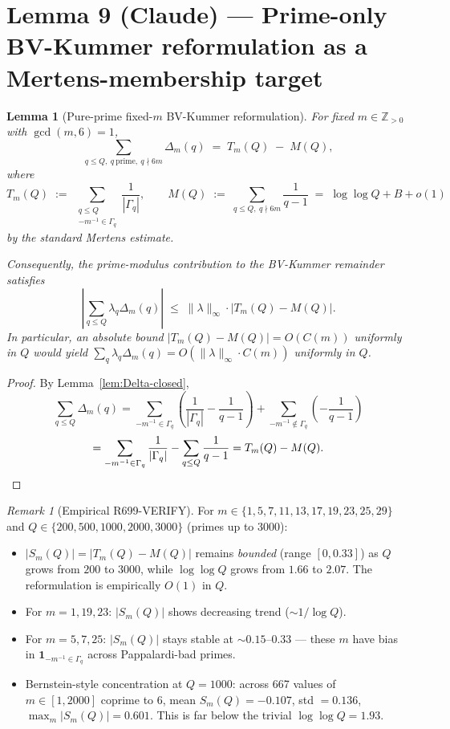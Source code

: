 \documentclass[12pt]{amsart}
\newtheorem{lemma}{Lemma}
\theoremstyle{definition}
\theoremstyle{remark}
\newtheorem{remark}{Remark}
\begin{document}
\section{Lemma 9 (\textbf{Claude}) --- Prime-only BV-Kummer reformulation as a Mertens-membership target}

\begin{lemma}[Pure-prime fixed-$m$ BV-Kummer reformulation]\label{lem:Claude-Mertens}
For fixed $m \in \mathbb{Z}_{> 0}$ with $\gcd(m, 6) = 1$,
$$
\sum_{q \le Q,\ q\ \text{prime},\ q \nmid 6m} \Delta_m(q)
\;=\;
T_m(Q) \;-\; M(Q),
$$
where
$$
T_m(Q)
\;:=\;
\sum_{\substack{q \le Q \\ -m^{-1} \in \Gamma_q}}
\frac{1}{|\Gamma_q|},
\qquad
M(Q)
\;:=\;
\sum_{q \le Q,\ q \nmid 6m}
\frac{1}{q - 1}
\;=\;
\log\log Q + B + o(1)
$$
by the standard Mertens estimate.

Consequently, the prime-modulus contribution to the BV-Kummer remainder satisfies
$$
\left| \sum_{q \le Q} \lambda_q \Delta_m(q) \right|
\;\le\;
\|\lambda\|_\infty \cdot |T_m(Q) - M(Q)|.
$$
In particular, an absolute bound $|T_m(Q) - M(Q)| = O(C(m))$ uniformly in $Q$ would yield
$\sum_q \lambda_q \Delta_m(q) = O(\|\lambda\|_\infty \cdot C(m))$ uniformly in $Q$.
\end{lemma}

\begin{proof}
By Lemma~\ref{lem:Delta-closed},
$$
\sum_{q \le Q} \Delta_m(q)
=
\sum_{-m^{-1} \in \Gamma_q} \left( \frac{1}{|\Gamma_q|} - \frac{1}{q - 1} \right)
+
\sum_{-m^{-1} \notin \Gamma_q} \left( -\frac{1}{q - 1} \right)
$$
$$
=
\sum_{-m^{-1} \in \Gamma_q} \frac{1}{|\Gamma_q|}
-
\sum_{q \le Q} \frac{1}{q - 1}
=
T_m(Q) - M(Q). \qedhere
$$
\end{proof}

\begin{remark}[Empirical R699-VERIFY]
For $m \in \{1, 5, 7, 11, 13, 17, 19, 23, 25, 29\}$ and $Q \in \{200, 500, 1000, 2000, 3000\}$ (primes up to 3000):
\begin{itemize}
\item $|S_m(Q)| = |T_m(Q) - M(Q)|$ remains \emph{bounded} (range $[0, 0.33]$) as $Q$ grows from $200$ to $3000$, while $\log\log Q$ grows from $1.66$ to $2.07$. The reformulation is empirically $O(1)$ in $Q$.
\item For $m = 1, 19, 23$: $|S_m(Q)|$ shows decreasing trend ($\sim 1/\log Q$).
\item For $m = 5, 7, 25$: $|S_m(Q)|$ stays stable at $\sim 0.15$--$0.33$ — these $m$ have bias in $\mathbf{1}_{-m^{-1} \in \Gamma_q}$ across Pappalardi-bad primes.
\item Bernstein-style concentration at $Q = 1000$: across 667 values of $m \in [1, 2000]$ coprime to 6, mean $S_m(Q) = -0.107$, std $= 0.136$, $\max_m |S_m(Q)| = 0.601$. This is far below the trivial $\log\log Q = 1.93$.
\end{itemize}
\end{remark}
\end{document}
